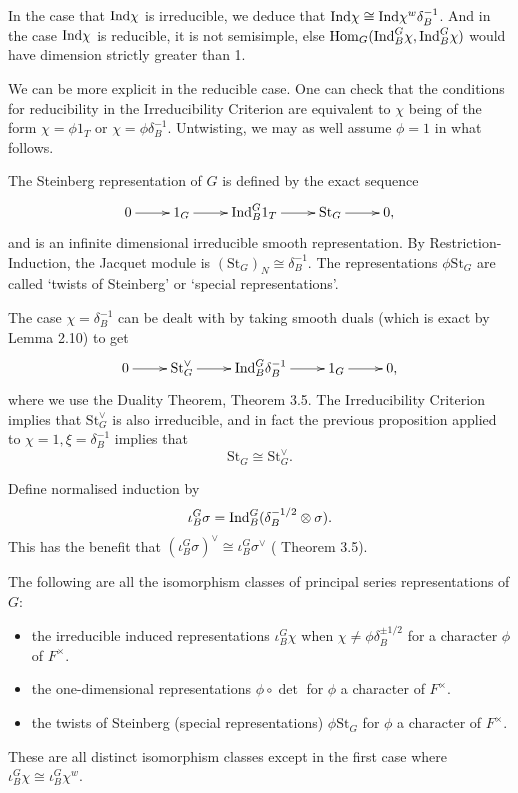 \begin{rem}
In the case that $\mathrm{Ind} \chi$ is irreducible, we deduce that $\mathrm{Ind} \chi \cong \mathrm{Ind} \chi^w \delta_B^{-1}$. And in the case $\mathrm{Ind} \chi$ is reducible, it is not semisimple, else $\mathrm{Hom}_G(\mathrm{Ind}_B^G \chi, \mathrm{Ind}_B^G \chi)$ would have dimension strictly greater than 1.
\end{rem}

We can be more explicit in the reducible case. One can check that the conditions for reducibility in the Irreducibility Criterion are equivalent to $\chi$ being of the form $\chi = \phi 1_T$ or $\chi =\phi \delta_B^{-1}$. Untwisting, we may as well assume $\phi=1$ in what follows.

\begin{defn}
    The Steinberg representation of $G$ is defined by the exact sequence
    $$\xymatrix{0 \ar[r] & 1_G \ar[r] & \Ind_B^G 1_T \ar[r] & \mathrm{St}_G \ar[r] & 0,}$$ and is an infinite dimensional irreducible smooth representation. By Restriction-Induction, the Jacquet module is $(\mathrm{St}_G)_N \cong \delta_B^{-1}$. The representations $\phi \mathrm{St}_G$ are called `twists of Steinberg' or `special representations'.
\end{defn}

The case $\chi = \delta_B^{-1}$ can be dealt with by taking smooth duals (which is exact by \cite{BH1} Lemma 2.10) to get 
$$\xymatrix{0 \ar[r] & \mathrm{St}_G^\vee \ar[r] & \Ind_B^G \delta_B^{-1} \ar[r] & 1_G \ar[r] & 0,}$$ where we use the Duality Theorem, \cite{BH1} Theorem 3.5. The Irreducibility Criterion implies that $\mathrm{St}_G^\vee$ is also irreducible, and in fact the previous proposition applied to $\chi=1, \xi = \delta_B^{-1}$ implies that
$$\mathrm{St}_G \cong \mathrm{St}_G^\vee.$$

\begin{notn}
    Define normalised induction by
    $$\iota_B^G \sigma = \mathrm{Ind}_B^G (\delta_B^{-1/2} \otimes \sigma).$$
    This has the benefit that $(\iota_B^G \sigma)^\vee \cong \iota_B^G \sigma^\vee$ (\cite{BH1} Theorem 3.5).
\end{notn}

\begin{thm}\label{classify}
    The following are all the isomorphism classes of principal series representations of $G$:
    \begin{itemize}
        \item the irreducible induced representations $\iota_B^G \chi$ when $\chi \neq \phi \delta_B^{\pm 1/2}$ for a character $\phi$ of $F^\times$.
        \item the one-dimensional representations $\phi \circ \det$ for $\phi$ a character of $F^\times$.
        \item the twists of Steinberg (special representations) $\phi \mathrm{St}_G$ for $\phi$ a character of $F^\times$.
    \end{itemize}
    These are all distinct isomorphism classes except in the first case where $\iota_B^G \chi \cong \iota_B^G \chi^w$.
\end{thm}